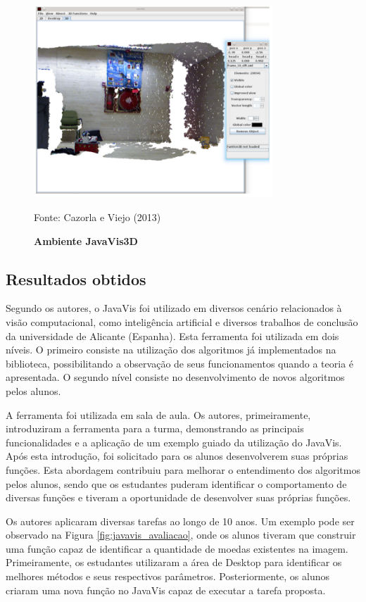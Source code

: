 \documentclass[
	12pt,				%
	oneside,			%
	a4paper,			%
	english,			%
	french,				%
	spanish,			%
	brazil,				%
	]{abntex2}
\begin{document}
\begin{figure}[ht]
\centering
\caption{\textbf{Ambiente JavaVis3D}}
\includegraphics[width=0.8\textwidth]{imagens/javavis_3d.png}

Fonte: Cazorla e Viejo  (2013)
\label{fig:javavis_3d}
\end{figure}

\subsection{Resultados obtidos}

Segundo os autores, o JavaVis foi utilizado em diversos cenário relacionados à visão computacional, como inteligência artificial e diversos trabalhos de conclusão da universidade de Alicante (Espanha). Esta ferramenta foi utilizada em dois níveis. O primeiro consiste na utilização dos algoritmos já implementados na biblioteca, possibilitando a observação de seus funcionamentos quando a teoria é apresentada. O segundo nível consiste no desenvolvimento de novos algoritmos pelos alunos.

A ferramenta foi utilizada em sala de aula. Os autores, primeiramente, introduziram a ferramenta para a turma, demonstrando as principais funcionalidades e a aplicação de um exemplo guiado da utilização do JavaVis. Após esta introdução, foi solicitado para os alunos desenvolverem suas próprias funções. Esta abordagem contribuiu para melhorar o entendimento dos algoritmos pelos alunos, sendo que os estudantes puderam identificar o comportamento de diversas funções e tiveram a oportunidade de desenvolver suas próprias funções.

Os autores aplicaram diversas tarefas ao longo de 10 anos. Um exemplo pode ser observado na Figura \ref{fig:javavis_avaliacao}, onde os alunos tiveram que construir uma função capaz de identificar a quantidade de moedas existentes na imagem. Primeiramente, os estudantes utilizaram a área de Desktop para identificar os melhores métodos e seus respectivos parâmetros. Posteriormente, os alunos criaram uma nova função no JavaVis capaz de executar a tarefa proposta.
\end{document}
